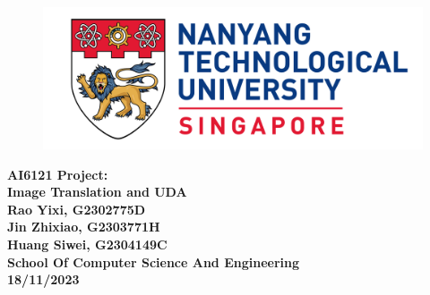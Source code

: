 \begin{titlepage}

\begin{figure}[H]
\centering
\includegraphics[width=\textwidth]{Title/logo.png}
\caption*{}\label{fig:entropy} 
\end{figure}

\centering
\LARGE{\textbf{AI6121 Project:}}\\
\LARGE{\textbf{Image Translation and UDA}}\\[2.0in]

\large{\textbf{Rao Yixi, G2302775D}}\\
\large{\textbf{Jin Zhixiao, G2303771H}}\\
\large{\textbf{Huang Siwei, G2304149C}}\\[1in]

\textbf{School Of Computer Science And Engineering}\\[0.75in]

\textbf{18/11/2023}
\newpage
\end{titlepage}